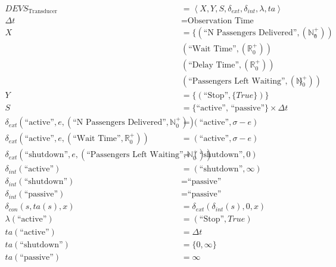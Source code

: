\begin{align*} DEVS_{\textrm{Transducer}} &= \left<X,Y,S,\delta_{ext},\delta_{int},\lambda,ta\right> \\
\Delta t &= \text{Observation Time} \\
X &= \lbrace (\text{``N Passengers Delivered''},(\mathbb{N}_0^+)), \\
 & (\text{``Wait Time''},(\mathbb{R}_0^+)) \\
 & (\text{``Delay Time''},(\mathbb{R}_0^+)) \\
 & (\text{``Passengers Left Waiting''},(\mathbb{N}_0^+))\rbrace \\
Y &= \lbrace(\text{``Stop''},\lbrace True\rbrace)\rbrace \\
S &= \lbrace\text{``active'', ``passive''}\rbrace\times\Delta t \\
\delta_{ext}(\text{``active''},e,(\text{``N Passengers Delivered''},\mathbb{N}_0^+)) &= (\text{``active''},\sigma-e) \\
\delta_{ext}(\text{``active''},e,(\text{``Wait Time''},\mathbb{R}_0^+)) &= (\text{``active''},\sigma-e) \\
\delta_{ext}(\text{``shutdown''},e,(\text{``Passengers Left Waiting''},\mathbb{N}_0^+)) &= (\text{``shutdown''},0) \\
\delta_{int}(\text{``active''}) &= (\text{``shutdown''},\infty) \\
\delta_{int}(\text{``shutdown''}) &= \text{``passive''} \\
\delta_{int}(\text{``passive''}) &= \text{``passive''} \\
\delta_{con}(s,ta(s),x) &= \delta_{ext}(\delta_{int}(s),0,x) \\
\lambda(\text{``active''}) &= (\text{``Stop''},True) \\
ta(\text{``active''}) &= \Delta t \\
ta(\text{``shutdown''}) &= \lbrace 0,\infty\rbrace \\
ta(\text{``passive''}) &= \infty \\
\end{align*}

